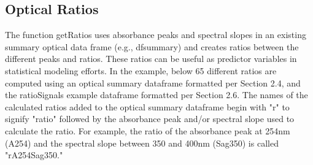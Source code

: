 \documentclass[a4paper,11pt]{article}\usepackage[]{graphicx}\usepackage[]{color}
\begin{document}
\subsection{Optical Ratios}
The function getRatios uses absorbance peaks and spectral slopes in an existing summary optical data frame (e.g., dfsummary) and creates ratios between the different peaks and ratios. These ratios can be useful as predictor variables in statistical modeling efforts. In the example, below 65 different ratios are computed using an optical summary dataframe formatted per Section 2.4, and the ratioSignals example dataframe formatted per Section 2.6. The names of the calculated ratios added to the optical summary dataframe begin with "r" to signify "ratio" followed by the absorbance peak and/or spectral slope used to calculate the ratio. For example, the ratio of the absorbance peak at 254nm (A254) and the spectral slope between 350 and 400nm (Sag350) is called "rA254\textunderscore Sag350."
\end{document}
